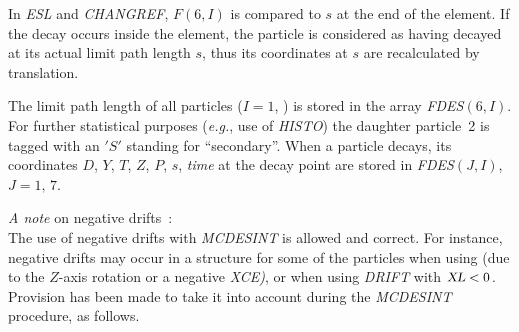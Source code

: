 \bigskip
\begin{figure}[H]
{\setlength{\captionwidth}{15cm}
       }
\end{figure}

\noindent In   \textsl{ESL}   and  \textsl{CHANGREF},  
$ F(6,I) $ is compared to $ s $ at the
end of the element. If the decay occurs inside the element, the particle is considered as having 
decayed at its actual limit path length $ s$,  thus its coordinates 
at $ s $ are recalculated by translation.  
\bigskip

\noindent The limit path length of all particles  ($I=1$, \IMAX{})   is stored in
the array  \textsl{FDES}$(6,I)$.  
For further statistical purposes
(\emph{e.g.}, use of \textsl{HISTO}) the daughter  particle~2    
is tagged with an $ 'S' $ standing for ``secondary''. When a particle decays, 
its coordinates $ D$, $Y$, $T$, $Z$, $P $, $s$, \textsl{time} at the decay point are stored in  
\textsl{FDES}$(J,I)$, \mbox{$ J=1,\, 7$}.  
\bigskip

\noindent \textsl {A  note}  on negative drifts~: \\
The use  of  negative  drifts  with  \textsl{MCDESINT}  is  allowed 
and correct. 
For instance,  negative drifts  may  occur  in  a  structure   for 
some  of  the  particles  when  using  \CHANGREF{} (due to  the  $ Z$-axis 
rotation  or  a negative  \textsl{XCE)},  or  when  using  \textsl{DRIFT}  with 
$\textsl{XL}<0$. 
Provision  has  been  made  to  take  it  into  account during  the \textsl{MCDESINT}
 procedure,  as follows. 

